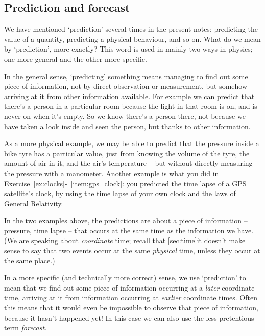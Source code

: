 


\subsection{Prediction and forecast}
\label{sec:forecast}

We have mentioned \enquote*{prediction} several times in the present notes: predicting the value of a quantity, predicting a physical behaviour, and so on. What do we mean by \enquote*{prediction}, more exactly? This word is used in mainly two ways in physics; one more general and the other more specific.

In the general sense, \enquote*{predicting} something means managing to find out some piece of information, not by direct observation or measurement, but somehow arriving at it from other information available. For example we can predict that there's a person in a particular room because the light in that room is on, and is never on when it's empty. So we know there's a person there, not because we have taken a look inside and seen the person, but thanks to other information.

As a more physical example, we may be able to predict that the pressure inside a bike tyre has a particular value, just from knowing the volume of the tyre, the amount of air in it, and the air's temperature -- but without directly measuring the pressure with a manometer. Another example is what you did in Exercise~\ref{ex:clocks}-~\ref{item:gps_clock}: you predicted the time lapse of a GPS satellite's clock, by using the time lapse of your own clock and the laws of General Relativity.

In the two examples above, the predictions are about a piece of information -- pressure, time lapse -- that occurs at the same time as the information we have. (We are speaking about \emph{coordinate} time; recall that \autoref{sec:time}{it doesn't make sense to say that two events occur at the same \emph{physical} time}, unless they occur at the same place.)

\medskip

In a more specific (and technically more correct) sense, we use \enquote*{prediction} to mean that we find out some piece of information occurring at a \emph{later} coordinate time, arriving at it from information occurring at \emph{earlier} coordinate times. Often this means that it would even be impossible to observe that piece of information, because it hasn't happened yet! In this case we can also use the less pretentious term \emph{forecast}.

